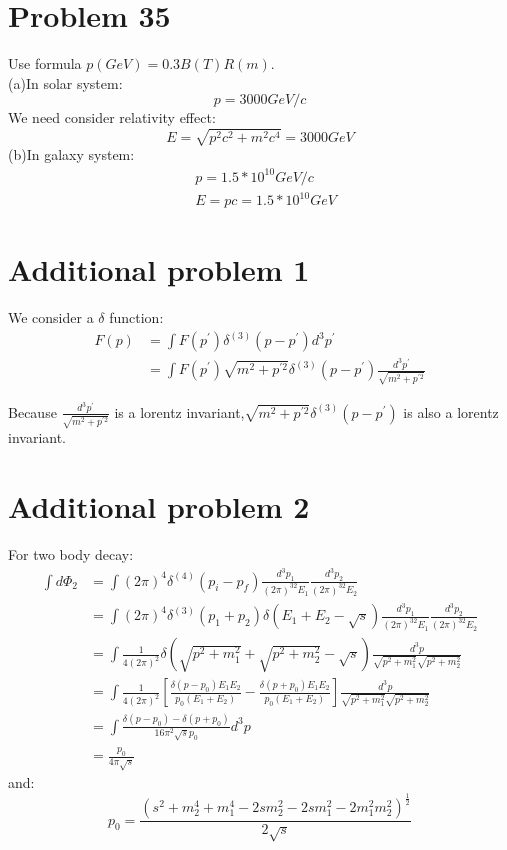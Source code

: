 \documentclass{article}
\begin{document}
\begin{CJK*}{GBK}{song}
\section{Problem 35}
Use formula $p(GeV)=0.3B(T)R(m)$.\\
(a)In solar system:
\begin{equation}
p=3000GeV/c
\end{equation}
We need consider relativity effect:
\begin{equation}
E=\sqrt{p^2c^2+m^2c^4}=3000GeV
\end{equation}
(b)In galaxy system:
\begin{equation}
\begin{aligned}
&p=1.5*10^{10}GeV/c\\
&E=pc=1.5*10^{10}GeV
\end{aligned}
\end{equation}

\section{Additional problem 1}
We consider a $\delta$ function:
\begin{equation}
\begin{aligned}
F(p)&=\int F(p^{'})\delta^{(3)}(p-p^{'})d^3p^{'}\\
      &=\int F(p^{'})\sqrt{m^2+p^{'2}}\delta^{(3)}(p-p^{'})\frac{d^3p^{'}}{\sqrt{m^2+p^{'2}}}
\end{aligned}
\end{equation}


Because $\frac{d^3p^{'}}{\sqrt{m^2+p^{'2}}}$ is a lorentz invariant,$\sqrt{m^2+p^{'2}}\delta^{(3)}(p-p^{'})$ is also a lorentz invariant. 

\section{Additional problem 2}
For two body decay:
\begin{equation}
\begin{aligned}
\int d\Phi_2&=\int(2\pi)^4\delta^{(4)}(p_i-p_f)\frac{d^3p_1}{(2\pi)^32E_1}\frac{d^3p_2}{(2\pi)^32E_2}\\
&=\int(2\pi)^4\delta^{(3)}(p_1+p_2)\delta(E_1+E_2-\sqrt{s})\frac{d^3p_1}{(2\pi)^32E_1}\frac{d^3p_2}{(2\pi)^32E_2}\\
&=\int\frac{1}{4(2\pi)^2}\delta(\sqrt{p^2+m_1^2}+\sqrt{p^2+m_2^2}-\sqrt{s})\frac{d^3p}{\sqrt{p^2+m_1^2}\sqrt{p^2+m_2^2}}\\
&=\int\frac{1}{4(2\pi)^2}[\frac{\delta(p-p_0)E_1E_2}{p_0(E_1+E_2)}-\frac{\delta(p+p_0)E_1E_2}{p_0(E_1+E_2)}]\frac{d^3p}{\sqrt{p^2+m_1^2}\sqrt{p^2+m_2^2}}\\
&=\int\frac{\delta(p-p_0)-\delta(p+p_0)}{16\pi^2\sqrt{s}p_0}d^3p\\
&=\frac{p_0}{4\pi\sqrt{s}}
\end{aligned}
\end{equation}
and:
\begin{equation}
p_0=\frac{(s^2+m_2^4+m_1^4-2sm_2^2-2sm_1^2-2m_1^2m_2^2)^{\frac{1}{2}}}{2\sqrt{s}}
\end{equation}


\end{CJK*}
\end{document}
